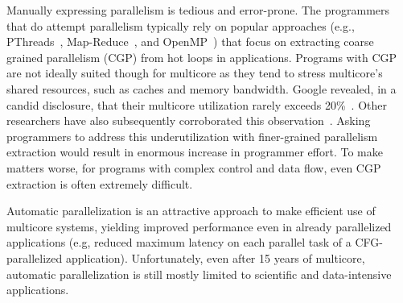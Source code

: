 Manually expressing parallelism is tedious and error-prone. The programmers that
do attempt parallelism typically rely on popular approaches (e.g.,
PThreads~\cite{pthread:web}, Map-Reduce~\cite{dean:08:cacm}, and
OpenMP~\cite{openmp:web}) that focus on extracting coarse grained parallelism
(CGP) from hot loops in applications.
%
Programs with CGP are not ideally suited though for multicore as they tend to
stress multicore's shared resources, such as caches and memory bandwidth.
Google revealed, in a candid disclosure, that their multicore utilization rarely
exceeds 20\%~\cite{barroso:07:computer}. Other researchers have also
subsequently corroborated this observation~\cite{chung:13:isca}.
%
Asking programmers to address this underutilization with finer-grained
parallelism extraction would result in enormous increase in programmer effort.
%
To make matters worse, for programs with complex control and data flow, even CGP
extraction is often extremely difficult.
%

Automatic parallelization is an attractive approach to make efficient use of
multicore systems, yielding improved performance even in already parallelized
applications (e.g, reduced maximum latency on each parallel task of a
CFG-parallelized application). Unfortunately, even after 15 years of multicore,
automatic parallelization is still mostly limited to scientific and
data-intensive applications.

